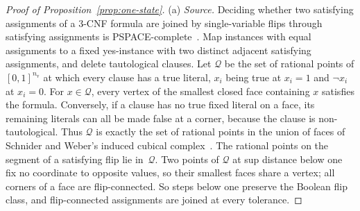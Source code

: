 \begin{proof}[Proof of Proposition~\ref{prop:one-state}]
(a) \emph{Source.} Deciding whether two satisfying assignments of a 3-CNF
formula are joined by single-variable flips through satisfying assignments
is PSPACE-complete~\cite[Lemma~3.6]{gopalan}. Map instances with equal
assignments to a fixed yes-instance with two distinct adjacent satisfying
assignments, and delete tautological clauses. Let $\mathcal Q$ be the set
of rational points of $[0,1]^{n_{\mathrm v}}$ at which every clause has a
true literal, $x_i$ being true at $x_i=1$ and $\neg x_i$ at $x_i=0$. For
$x\in\mathcal Q$, every vertex of the smallest closed face containing $x$
satisfies the formula.
Conversely, if a clause has no true fixed literal on a face, its remaining
literals can all be made false at a corner, because the clause is
non-tautological. Thus $\mathcal Q$ is exactly the set of rational points
in the union of faces of Schnider and Weber's induced cubical
complex~\cite[Definition~4]{schniderweber}. The rational points on the segment of a satisfying flip lie in~$\mathcal Q$. Two points of $\mathcal Q$ at sup distance
below one fix no coordinate to opposite values, so their smallest faces
share a vertex; all corners of a face are flip-connected. So steps below
one preserve the Boolean flip class, and flip-connected assignments are
joined at every tolerance.


\end{proof}
